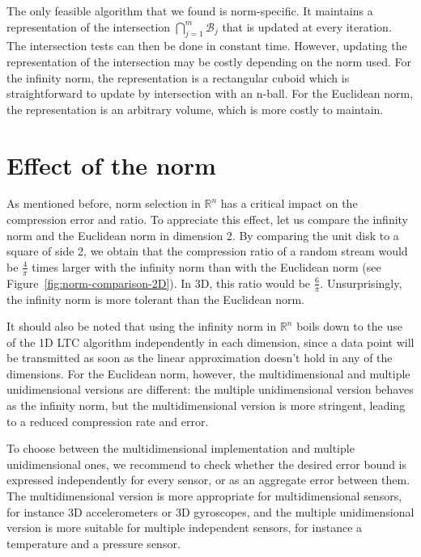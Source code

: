The only feasible algorithm that we found is norm-specific. It
maintains a representation of the intersection
$\bigcap_{j=1}^{m}{\mathcal{B}_j}$ that is updated at every iteration.
The intersection tests can then be done in constant time. However,
updating the representation of the intersection may be costly
depending on the norm used. For the infinity norm, the representation
is a rectangular cuboid which is straightforward to update by
intersection with an n-ball.
For the Euclidean norm, the representation is an arbitrary volume,
which is more costly to maintain.

\section{Effect of the norm}
\label{sec:effect-norm}

As mentioned before, norm selection in $\mathbb{R}^n$ has a critical impact on
the compression error and ratio. To appreciate this effect, let us compare the
infinity norm and the Euclidean norm in dimension 2. By comparing the unit disk
to a square of side 2, we obtain that the compression ratio of a random stream
would be $\frac{4}{\pi}$ times larger with the infinity norm than with the
Euclidean norm (see Figure~\ref{fig:norm-comparison-2D}). In 3D, this ratio
would be $\frac{6}{\pi}$. Unsurprisingly, the infinity norm is more tolerant
than the Euclidean norm.

It should also be noted that using the infinity norm in $\mathbb{R}^n$ boils
down to the use of the 1D LTC algorithm independently in each dimension, since
a data point will be transmitted as soon as the linear approximation doesn't
hold in any of the dimensions. For the Euclidean norm, however, the
multidimensional and multiple unidimensional versions are different: the
multiple unidimensional version behaves as the infinity norm, but the
multidimensional version is more stringent, leading to a reduced compression
rate and error.

To choose between the multidimensional implementation and multiple
unidimensional ones, we recommend to check whether the desired error bound is
expressed independently for every sensor, or as an aggregate error between them.
The multidimensional version is more appropriate for multidimensional sensors,
for instance 3D accelerometers or 3D gyroscopes, and the multiple unidimensional
version is more suitable for multiple independent sensors, for instance a
temperature and a pressure sensor.


